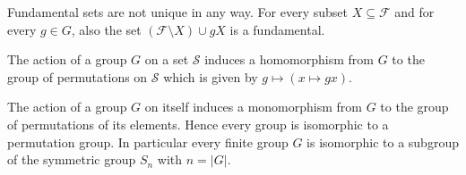 \begin{remark}
Fundamental sets are not unique in any way. For every subset $X \subseteq \mathcal{F}$ and for every $g \in G$, also the set $(\mathcal{F} \setminus X) \cup gX$ is a fundamental.
\end{remark}

\begin{theorem}
\label{thm_GroupActionHom}
The action of a group $G$ on a set $\mathcal{S}$ induces a homomorphism from $G$ to the group of permutations on $\mathcal{S}$ which is given by $g \mapsto (x \mapsto gx)$.
\end{theorem}

\begin{corollary}[Cayley]
The action of a group $G$ on itself induces a monomorphism from $G$ to the group of permutations of its elements. Hence every group is isomorphic to a permutation group. In particular every finite group $G$ is isomorphic to a subgroup of the symmetric group $S_n$ with $n = |G|$.
\end{corollary}
